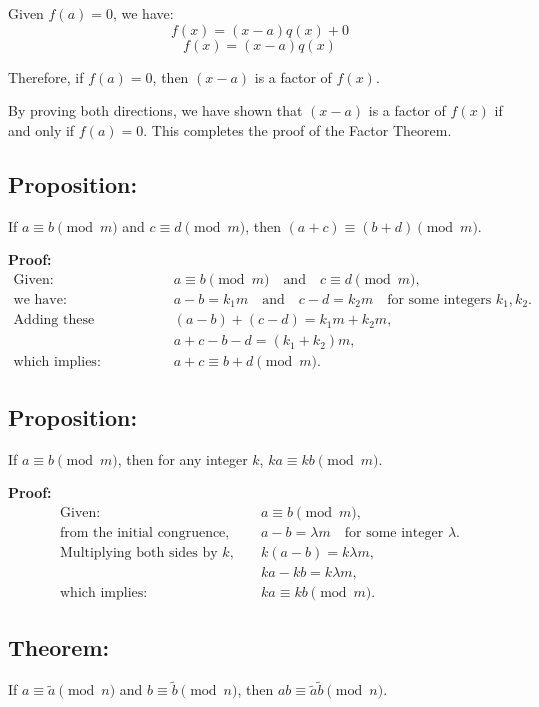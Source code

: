 \documentclass{article}
\begin{document}
Given \( f(a) = 0 \), we have:
\[
f(x) = (x - a)q(x) + 0
\]
\[
f(x) = (x - a)q(x)
\]

Therefore, if \( f(a) = 0 \), then \( (x - a) \) is a factor of \( f(x) \).

By proving both directions, we have shown that \( (x - a) \) is a factor of \( f(x) \) if and only if \( f(a) = 0 \). This completes the proof of the Factor Theorem. 



\subsection*{Proposition:} If \(a \equiv b \pmod{m}\) and \(c \equiv d \pmod{m}\), then \((a + c) \equiv (b + d) \pmod{m}\).

\textbf{Proof:}
\begin{align*}
\text{Given:} & \quad a \equiv b \pmod{m} \quad \text{and} \quad c \equiv d \pmod{m}, \\
\text{we have:} & \quad a - b = k_1m \quad \text{and} \quad c - d = k_2m \quad \text{for some integers } k_1, k_2. \\
\text{Adding these equations, we get:} & \quad (a - b) + (c - d) = k_1m + k_2m, \\
 & \quad a + c - b - d = (k_1 + k_2)m, \\
\text{which implies:} & \quad a + c \equiv b + d \pmod{m}.
\end{align*}

\subsection*{Proposition:} If \(a \equiv b \pmod{m}\), then for any integer \(k\), \(ka \equiv kb \pmod{m}\).

\textbf{Proof:}
\begin{align*}
\text{Given:} & \quad a \equiv b \pmod{m}, \\
\text{from the initial congruence,} & \quad a - b = \lambda m \quad \text{for some integer } \lambda. \\
\text{Multiplying both sides by } k, & \quad k(a - b) = k\lambda m, \\
 & \quad ka - kb = k\lambda m, \\
\text{which implies:} & \quad ka \equiv kb \pmod{m}.
\end{align*}

\subsection*{Theorem:} If \( a \equiv \tilde{a} \pmod{n} \) and \( b \equiv \tilde{b} \pmod{n} \), then \( ab \equiv \tilde{a}\tilde{b} \pmod{n} \).
\end{document}

